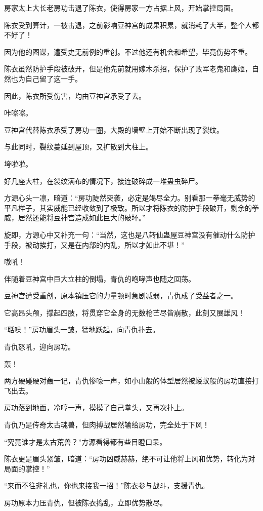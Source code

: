 \begin{this_body}
房家太上大长老房功击退了陈衣，使得房家一方占据上风，开始掌控局面。

陈衣受到算计，一被击退，之前影响豆神宫的成果积累，就消耗了大半，整个人都不好了！

因为他的图谋，遭受史无前例的重创。不过他还有机会和希望，毕竟伤势不重。

陈衣虽然防护手段被破开，但是他先前就用嫁木杀招，保护了败军老鬼和鹰姬，自然也为自己留了这一手。

因此，陈衣所受伤害，均由豆神宫承受了去。

咔嚓嚓。

豆神宫代替陈衣承受了房功一圈，大殿的墙壁上开始不断出现了裂纹。

与此同时，裂纹蔓延到屋顶，又扩散到大柱上。

垮啦啦。

好几座大柱，在裂纹满布的情况下，接连破碎成一堆蛊虫碎尸。

方源心头一凛，暗道：“房功陡然突袭，必定是竭尽全力。别看那一拳毫无威势的平凡样子，其实威能已经收敛到了极致。所以才将陈衣的防护手段破开，剩余的拳威，居然还能将豆神宫造成如此巨大的破坏。”

旋即，方源心中又补充一句：“当然，这也是八转仙蛊屋豆神宫没有催动什么防护手段，被动挨打，又是在内部的内乱，所以才如此不堪！”

嗷吼！

伴随着豆神宫中巨大立柱的倒塌，青仇的咆哮声也随之回荡。

豆神宫遭受重创，原本镇压它的力量顿时急剧减弱，青仇成了受益者之一。

它高昂头颅，撑起四肢，将贯穿它全身的无数枪芒尽皆崩散，此刻又展雄风！

“聒噪！”房功眉头一皱，猛地跃起，向青仇扑去。

青仇怒吼，迎向房功。

轰！

两方硬碰硬对轰一记，青仇惨嚎一声，如小山般的体型居然被蝼蚁般的房功直接打飞出去。

房功落到地面，冷哼一声，摸摸了自己拳头，又再次扑上。

青仇乃是传奇太古魂兽，但肉搏战居然输给房功，完全处于下风！

“究竟谁才是太古荒兽？”方源看得都有些目瞪口呆。

陈衣更是眉头紧皱，暗道：“房功凶威赫赫，绝不可让他将上风和优势，转化为对局面的掌控！”

“来而不往非礼也，你也来接我一招！”陈衣参与战斗，支援青仇。

房功原本力压青仇，但被陈衣捣乱，立即优势散尽。


\end{this_body}
